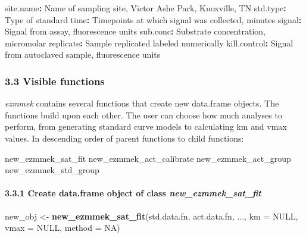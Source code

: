\documentclass[
]{article}
\newenvironment{Shaded}{\begin{snugshade}}{\end{snugshade}}
\newcommand{\DataTypeTok}[1]{\textcolor[rgb]{0.13,0.29,0.53}{#1}}
\newcommand{\KeywordTok}[1]{\textcolor[rgb]{0.13,0.29,0.53}{\textbf{#1}}}
\newcommand{\NormalTok}[1]{#1}
\newcommand{\OperatorTok}[1]{\textcolor[rgb]{0.81,0.36,0.00}{\textbf{#1}}}
\newcommand{\OtherTok}[1]{\textcolor[rgb]{0.56,0.35,0.01}{#1}}
\newcommand{\StringTok}[1]{\textcolor[rgb]{0.31,0.60,0.02}{#1}}
\begin{document}
\begin{Shaded}
\begin{Highlighting}[]
\NormalTok{site.name}\OperatorTok{:}\StringTok{ }\NormalTok{Name of sampling site, Victor Ashe Park, Knoxville, TN}
\NormalTok{std.type}\OperatorTok{:}\StringTok{ }\NormalTok{Type of standard}
\NormalTok{time}\OperatorTok{:}\StringTok{ }\NormalTok{Timepoints at which signal was collected, minutes}
\NormalTok{signal}\OperatorTok{:}\StringTok{ }\NormalTok{Signal from assay, fluorescence units}
\NormalTok{sub.conc}\OperatorTok{:}\StringTok{ }\NormalTok{Substrate concentration, micromolar}
\NormalTok{replicate}\OperatorTok{:}\StringTok{ }\NormalTok{Sample replicated labeled numerically}
\NormalTok{kill.control}\OperatorTok{:}\StringTok{ }\NormalTok{Signal from autoclaved sample, fluorescence units}
\end{Highlighting}
\end{Shaded}

\hypertarget{visible-functions}{%
\subsubsection{3.3 Visible functions}\label{visible-functions}}

\emph{ezmmek} contains several functions that create new data.frame
objects. The functions build upon each other. The user can choose how
much analyses to perform, from generating standard curve models to
calculating km and vmax values. In descending order of parent functions
to child functions:

\begin{Shaded}
\begin{Highlighting}[]
\NormalTok{new\_ezmmek\_sat\_fit}
\NormalTok{new\_ezmmek\_act\_calibrate}
\NormalTok{new\_ezmmek\_act\_group}
\NormalTok{new\_ezmmek\_std\_group}
\end{Highlighting}
\end{Shaded}

\hypertarget{create-data.frame-object-of-class-new_ezmmek_sat_fit}{%
\paragraph{\texorpdfstring{3.3.1 Create data.frame object of class
\emph{new\_ezmmek\_sat\_fit}}{3.3.1 Create data.frame object of class new\_ezmmek\_sat\_fit}}\label{create-data.frame-object-of-class-new_ezmmek_sat_fit}}

\begin{Shaded}
\begin{Highlighting}[]
\NormalTok{new\_obj <{-}}\StringTok{ }\KeywordTok{new\_ezmmek\_sat\_fit}\NormalTok{(std.data.fn,}
\NormalTok{                              act.data.fn,}
\NormalTok{                              ...,}
                              \DataTypeTok{km =} \OtherTok{NULL}\NormalTok{,}
                              \DataTypeTok{vmax =} \OtherTok{NULL}\NormalTok{,}
                              \DataTypeTok{method =} \OtherTok{NA}\NormalTok{)}
\end{Highlighting}
\end{Shaded}
\end{document}
